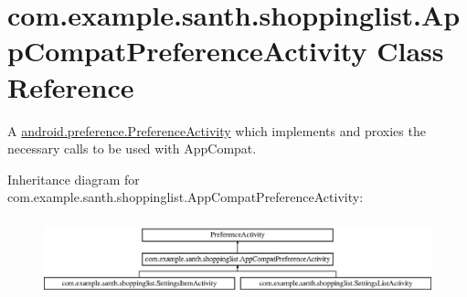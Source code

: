 \hypertarget{classcom_1_1example_1_1santh_1_1shoppinglist_1_1_app_compat_preference_activity}{}\section{com.\+example.\+santh.\+shoppinglist.\+App\+Compat\+Preference\+Activity Class Reference}
\label{classcom_1_1example_1_1santh_1_1shoppinglist_1_1_app_compat_preference_activity}


A \hyperlink{}{android.\+preference.\+Preference\+Activity} which implements and proxies the necessary calls to be used with App\+Compat.  


Inheritance diagram for com.\+example.\+santh.\+shoppinglist.\+App\+Compat\+Preference\+Activity\+:\begin{figure}[H]
\begin{center}
\leavevmode
\includegraphics[height=2.258065cm]{classcom_1_1example_1_1santh_1_1shoppinglist_1_1_app_compat_preference_activity}
\end{center}
\end{figure}
